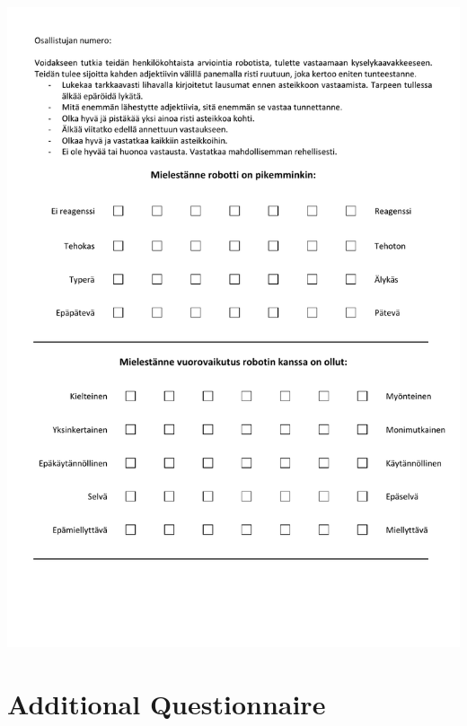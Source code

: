 \begin{center}
	\includegraphics[page=2, width=\textwidth]{figures/annexe1/1PeRDITA_vParticipantFINNOIS.pdf} 
\end{center}

\section{Additional Questionnaire}\label{app:add_questionnaire}

